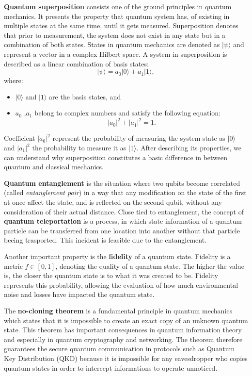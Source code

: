 \documentclass[12pt]{ieeetj}
\begin{document}
		\textbf{Quantum superposition} consists one of the ground principles in quantum mechanics. 
		It presents the property that quantum system has, of existing in multiple states at the same time, until it gets measured. 
		Superposition denotes that prior to measurement, the system does not exist in any state but in a combination of both states.
		States in quantum mechanics are denoted as $|\psi\rangle$ and represent a vector in a complex Hilbert space. 
		A system in superposition is described as a linear combination of basis states:
			\[
			|\psi\rangle = a_0 |0\rangle + a_1 |1\rangle,
			\]
		where:
		\begin{itemize}
			\item $|0\rangle$ and $|1\rangle$ are the basis states, and
			\item $a_0$ ,$a_1$ belong to complex numbers and satisfy the following equation:
			\[
			|a_0|^2 + |a_1|^2 = 1.
			\]
		\end{itemize}

		Coefficient $|a_0|^2$ represent the probability of measuring the system state as $|0\rangle$ and $|a_1|^2$ the probability to measure it
		as $|1\rangle$. After describing its properties, we can understand why superposition constitutes a 
		basic difference in between quantum and classical mechanics. 

		\textbf{Quantum entanglement} is the situation where two qubits become correlated
		(called \textit{entanglement pair}) in a way that
		any modification on the state of the first at once affect the state, and is reflected on the second qubit, 
		without any consideration of their actual distance. 
		Close tied to entanglement, the concept
		of \textbf{quantum teleportation} is a process, in which state information of a quantum particle can be transferred
		from one location into another without that particle beeing trasported.
		This incident is feasible due to the entanglement.
		
		Another important property is the \textbf{fidelity} of a quantum state.
		Fidelity is a metric  \( \textit{f} \in [0,1] \), denoting the quality of a quantum state.
		The higher the value is, the closer the quantum state is to what it was created to be.
		Fidelity represents this probability, allowing the evaluation of how much environmental noise
		and losses have impacted the quantum state.

		The \textbf{no-cloning theorem} is a fundamental principle in quantum mechanics 
		which states that it is impossible to create an exact copy of an unknown quantum state. 
		This theorem has important consequences in quantum information theory and especially in
		quantum cryptography and networking. The theorem therefore guarantees the secure quantum communication 
		in protocols such as Quantum Key Distribution (QKD) because it is impossible for any eavesdropper who copies
		quantum states in order to intercept informations to operate unnoticed.
\end{document}
